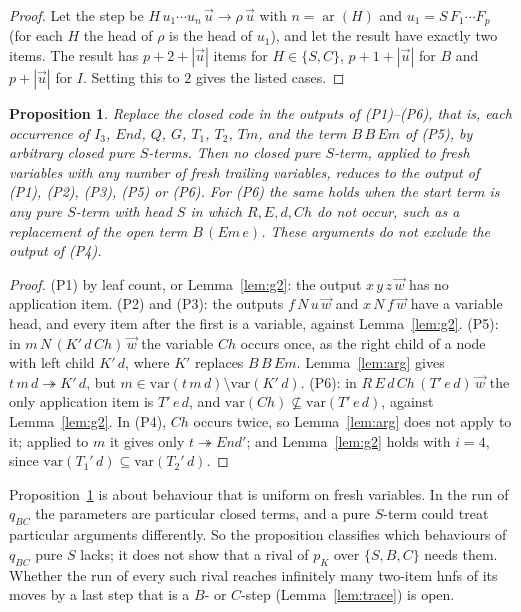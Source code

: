 \documentclass[11pt]{amsart}
\newtheorem{proposition}[theorem]{Proposition}
\theoremstyle{definition}
\newcommand{\red}{\twoheadrightarrow}
\newcommand{\pK}{p_K}
\newcommand{\qBC}{q_{BC}}
\newcommand{\Ir}{I_3}
\newcommand{\Em}{\mathit{Em}}
\newcommand{\End}{\mathit{End}}
\newcommand{\Tem}{\mathit{Tm}}
\newcommand{\Ch}{\mathit{Ch}}
\newcommand{\var}{\mathrm{var}}
\newcommand{\vw}{\vec w}
\begin{document}
\begin{proof}
Let the step be $H\,u_1\cdots u_n\,\vec u\to\rho\,\vec u$ with $n=\operatorname{ar}(H)$ and
$u_1=S\,F_1\cdots F_p$ (for each $H$ the head of $\rho$ is the head of $u_1$), and let the result have
exactly two items. The result has $p+2+|\vec u|$ items for $H\in\{S,C\}$, $p+1+|\vec u|$ for $B$ and
$p+|\vec u|$ for $I$. Setting this to $2$ gives the listed cases.
\end{proof}

\begin{proposition}\label{prop:class}
Replace the closed code in the outputs of (P1)--(P6), that is, each occurrence of $\Ir$, $\End$, $Q$,
$G$, $T_1$, $T_2$, $\Tem$, and the term $B\,B\,\Em$ of (P5), by arbitrary closed pure $S$-terms. Then no
closed pure $S$-term, applied to fresh variables with any number of fresh trailing variables, reduces to
the output of (P1), (P2), (P3), (P5) or (P6). For (P6) the same holds when the start term is any pure
$S$-term with head $S$ in which $R,E,d,\Ch$ do not occur, such as a replacement of the open term
$B\,(\Em\,e)$. These arguments do not exclude the output of (P4).
\end{proposition}

\begin{proof}
(P1) by leaf count, or Lemma~\ref{lem:g2}: the output $x\,y\,z\,\vw$ has no application item.
(P2) and (P3): the outputs $f\,N\,u\,\vw$ and $x\,N\,f\,\vw$ have a variable head, and every item after
the first is a variable, against Lemma~\ref{lem:g2}. (P5): in $m\,N\,(K'\,d\,\Ch)\,\vw$ the variable $\Ch$
occurs once, as the right child of a node with left child $K'\,d$, where $K'$ replaces $B\,B\,\Em$.
Lemma~\ref{lem:arg} gives $t\,m\,d\red K'\,d$, but $m\in\var(t\,m\,d)\setminus\var(K'\,d)$. (P6): in
$R\,E\,d\,\Ch\,(T'\,e\,d)\,\vw$ the only application item is $T'\,e\,d$, and
$\var(\Ch)\not\subseteq\var(T'\,e\,d)$, against Lemma~\ref{lem:g2}. In (P4), $\Ch$ occurs twice, so
Lemma~\ref{lem:arg} does not apply to it; applied to $m$ it gives only $t\red\End'$; and
Lemma~\ref{lem:g2} holds with $i=4$, since $\var(T_1'\,d)\subseteq\var(T_2'\,d)$.
\end{proof}

Proposition~\ref{prop:class} is about behaviour that is uniform on fresh variables. In the run of
$\qBC$ the parameters are particular closed terms, and a pure $S$-term could treat particular arguments
differently. So the proposition classifies which behaviours of $\qBC$ pure $S$ lacks; it does not show
that a rival of $\pK$ over $\{S,B,C\}$ needs them. Whether the run of every such rival reaches infinitely
many two-item hnfs of its moves by a last step that is a $B$- or $C$-step (Lemma~\ref{lem:trace}) is
open.
\end{document}
